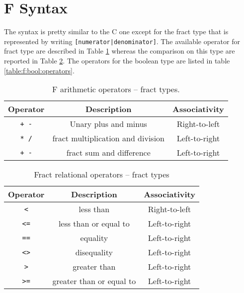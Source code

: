 \section{F Syntax}
The syntax is pretty similar to the C one except for the fract type that
is represented by writing \verb![numerator|denominator]!.
The available operator for fract type are described in Table
\ref{table:f:fract:operators} whereas the comparison on this type are reported
in Table \ref{table:f:fract:comparison:operators}.
The operators for the boolean type are listed in table 
\ref{table:f:bool:operators}.



\begin{table}[h]
\centering
\begin{tabular}{|c|c|c|}
\hline
\textbf{Operator} & \textbf{Description} & \textbf{Associativity} \\ 
\hline
\verb|+ -| & Unary plus and minus 	& Right-to-left	\\
\verb|* /| & fract multiplication and division & Left-to-right \\ 
\verb|+ -| & fract sum and difference & Left-to-right \\
\hline
\end{tabular}
\caption{F arithmetic operators -- fract types.}
\label{table:f:fract:operators}


\end{table}

\begin{table}[h]
\centering
\begin{tabular}{|c|c|c|}
\hline
\textbf{Operator} & \textbf{Description} & \textbf{Associativity} \\ 
\hline
\verb|<|	& less than	& Right-to-left	\\
\verb|<=|	& less than or equal to	& Left-to-right \\ 
\verb|==|	& equality & Left-to-right \\
\verb|<>|	& disequality & Left-to-right \\
\verb|>|	& greater than & Left-to-right\\
\verb|>=|	& greater than or equal to & Left-to-right \\
\hline
\end{tabular}
\caption{Fract relational operators -- fract types}
\label{table:f:fract:comparison:operators}
\end{table}


